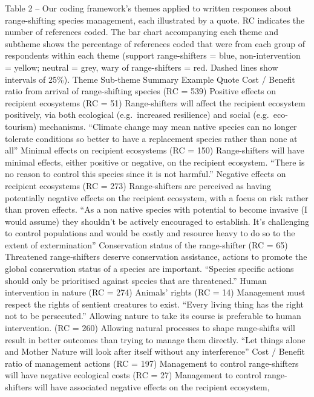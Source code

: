 \documentclass[
]{article}
\begin{document}
Table 2 -- Our coding framework's themes applied to written responses
about range-shifting species management, each illustrated by a quote. RC
indicates the number of references coded. The bar chart accompanying
each theme and subtheme shows the percentage of references coded that
were from each group of respondents within each theme (support
range-shifters = blue, non-intervention = yellow; neutral = grey, wary
of range-shifters = red. Dashed lines show intervals of 25\%). Theme
Sub-theme Summary Example Quote Cost / Benefit ratio from arrival of
range-shifting species (RC = 539) Positive effects on recipient
ecosystems (RC = 51) Range-shifters will affect the recipient ecosystem
positively, via both ecological (e.g.~increased resilience) and social
(e.g.~eco-tourism) mechanisms. ``Climate change may mean native species
can no longer tolerate conditions so better to have a replacement
species rather than none at all'' Minimal effects on recipient
ecosystems (RC = 150) Range-shifters will have minimal effects, either
positive or negative, on the recipient ecosystem. ``There is no reason
to control this species since it is not harmful.'' Negative effects on
recipient ecosystems (RC = 273) Range-shifters are perceived as having
potentially negative effects on the recipient ecosystem, with a focus on
risk rather than proven effects. ``As a non native species with
potential to become invasive (I would assume) they shouldn't be actively
encouraged to establish. It's challenging to control populations and
would be costly and resource heavy to do so to the extent of
extermination'' Conservation status of the range-shifter (RC = 65)
Threatened range-shifters deserve conservation assistance, actions to
promote the global conservation status of a species are important.
``Species specific actions should only be prioritised against species
that are threatened.'' Human intervention in nature (RC = 274) Animals'
rights (RC = 14) Management must respect the rights of sentient
creatures to exist. ``Every living thing has the right not to be
persecuted.'' Allowing nature to take its course is preferable to human
intervention. (RC = 260) Allowing natural processes to shape
range-shifts will result in better outcomes than trying to manage them
directly. ``Let things alone and Mother Nature will look after itself
without any interference'' Cost / Benefit ratio of management actions
(RC = 197) Management to control range-shifters will have negative
ecological costs (RC = 27) Management to control range-shifters will
have associated negative effects on the recipient ecosystem,
\end{document}
